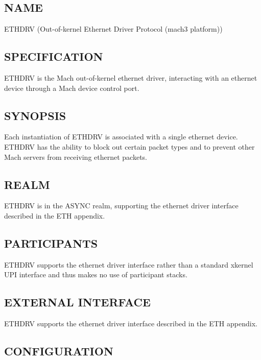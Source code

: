 %
%
%

\subsection*{NAME}

\noindent ETHDRV (Out-of-kernel Ethernet Driver Protocol (mach3 platform))

\subsection*{SPECIFICATION}

\noindent

ETHDRV is the Mach out-of-kernel ethernet driver, interacting with an
ethernet device through a Mach device control port.


\subsection*{SYNOPSIS}

\noindent 

Each instantiation of ETHDRV is associated with a single ethernet
device.  ETHDRV has the ability to block out certain packet types and
to prevent other Mach servers from receiving ethernet packets.


\subsection*{REALM}

ETHDRV is in the ASYNC realm, supporting the ethernet driver interface
described in the ETH appendix.


\subsection*{PARTICIPANTS}

ETHDRV supports the ethernet driver interface rather than a standard
xkernel UPI interface and thus makes no use of participant stacks.


\subsection*{EXTERNAL INTERFACE}

ETHDRV supports the ethernet driver interface
described in the ETH appendix.


\subsection*{CONFIGURATION}

